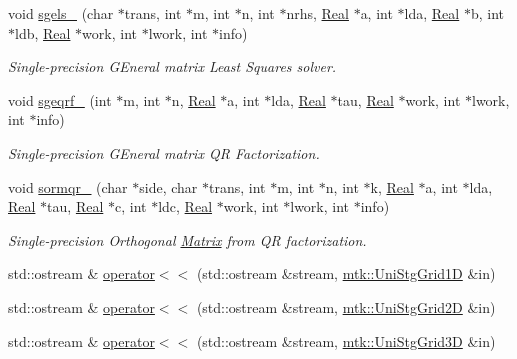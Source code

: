 \begin{DoxyCompactItemize}
\item 
void \hyperlink{namespacemtk_ada6df1b733204aa7ff0b1ec7556288f9}{sgels\+\_\+} (char $\ast$trans, int $\ast$m, int $\ast$n, int $\ast$nrhs, \hyperlink{group__c01-roots_gac080bbbf5cbb5502c9f00405f894857d}{Real} $\ast$a, int $\ast$lda, \hyperlink{group__c01-roots_gac080bbbf5cbb5502c9f00405f894857d}{Real} $\ast$b, int $\ast$ldb, \hyperlink{group__c01-roots_gac080bbbf5cbb5502c9f00405f894857d}{Real} $\ast$work, int $\ast$lwork, int $\ast$info)
\begin{DoxyCompactList}\small\item\em Single-\/precision G\+Eneral matrix Least Squares solver. \end{DoxyCompactList}\item 
void \hyperlink{namespacemtk_aece7419193d8ab43e186c97ad6d529fb}{sgeqrf\+\_\+} (int $\ast$m, int $\ast$n, \hyperlink{group__c01-roots_gac080bbbf5cbb5502c9f00405f894857d}{Real} $\ast$a, int $\ast$lda, \hyperlink{group__c01-roots_gac080bbbf5cbb5502c9f00405f894857d}{Real} $\ast$tau, \hyperlink{group__c01-roots_gac080bbbf5cbb5502c9f00405f894857d}{Real} $\ast$work, int $\ast$lwork, int $\ast$info)
\begin{DoxyCompactList}\small\item\em Single-\/precision G\+Eneral matrix Q\+R Factorization. \end{DoxyCompactList}\item 
void \hyperlink{namespacemtk_a59c58408e1c0a9837b67a417be986b82}{sormqr\+\_\+} (char $\ast$side, char $\ast$trans, int $\ast$m, int $\ast$n, int $\ast$k, \hyperlink{group__c01-roots_gac080bbbf5cbb5502c9f00405f894857d}{Real} $\ast$a, int $\ast$lda, \hyperlink{group__c01-roots_gac080bbbf5cbb5502c9f00405f894857d}{Real} $\ast$tau, \hyperlink{group__c01-roots_gac080bbbf5cbb5502c9f00405f894857d}{Real} $\ast$c, int $\ast$ldc, \hyperlink{group__c01-roots_gac080bbbf5cbb5502c9f00405f894857d}{Real} $\ast$work, int $\ast$lwork, int $\ast$info)
\begin{DoxyCompactList}\small\item\em Single-\/precision Orthogonal \hyperlink{classmtk_1_1Matrix}{Matrix} from Q\+R factorization. \end{DoxyCompactList}\item 
std\+::ostream \& \hyperlink{namespacemtk_a97f79d150b3b5c7b76d4fcc2271f972b}{operator$<$$<$} (std\+::ostream \&stream, \hyperlink{classmtk_1_1UniStgGrid1D}{mtk\+::\+Uni\+Stg\+Grid1\+D} \&in)
\item 
std\+::ostream \& \hyperlink{namespacemtk_a82cd99c0c7e695e4eccfbe7380525959}{operator$<$$<$} (std\+::ostream \&stream, \hyperlink{classmtk_1_1UniStgGrid2D}{mtk\+::\+Uni\+Stg\+Grid2\+D} \&in)
\item 
std\+::ostream \& \hyperlink{namespacemtk_a50ce3dc63af019c21e15e1b09465d334}{operator$<$$<$} (std\+::ostream \&stream, \hyperlink{classmtk_1_1UniStgGrid3D}{mtk\+::\+Uni\+Stg\+Grid3\+D} \&in)
\end{DoxyCompactItemize}
